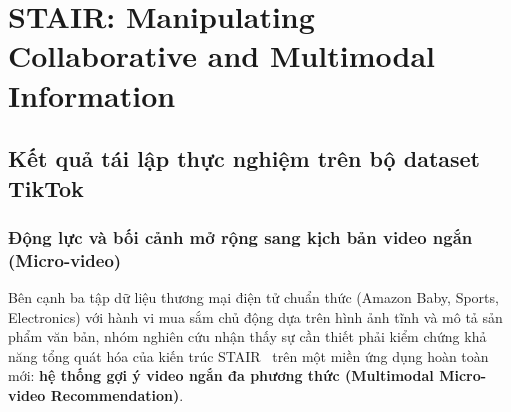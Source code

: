 \section{STAIR: Manipulating Collaborative and Multimodal Information}

\subsection{Kết quả tái lập thực nghiệm trên bộ dataset TikTok}
\label{sec:stair_reproduction_tiktok}

\subsubsection{Động lực và bối cảnh mở rộng sang kịch bản video ngắn (Micro-video)}

Bên cạnh ba tập dữ liệu thương mại điện tử chuẩn thức (Amazon Baby, Sports, Electronics) với hành vi mua sắm chủ động dựa trên hình ảnh tĩnh và mô tả sản phẩm văn bản, nhóm nghiên cứu nhận thấy sự cần thiết phải kiểm chứng khả năng tổng quát hóa của kiến trúc STAIR~\cite{xu2025stair} trên một miền ứng dụng hoàn toàn mới: \textbf{hệ thống gợi ý video ngắn đa phương thức (Multimodal Micro-video Recommendation)}.

